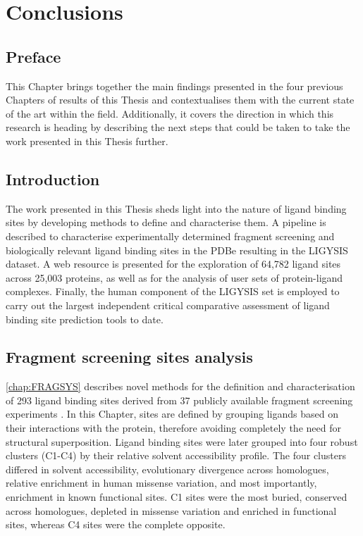 \chapter{Conclusions}

\section*{Preface}

This Chapter brings together the main findings presented in the four previous Chapters of results of this Thesis and contextualises them with the current state of the art within the field. Additionally, it covers the direction in which this research is heading by describing the next steps that could be taken to take the work presented in this Thesis further.

\section{Introduction}

The work presented in this Thesis sheds light into the nature of ligand binding sites by developing methods to define and characterise them. A pipeline is described to characterise experimentally determined fragment screening and biologically relevant ligand binding sites in the PDBe resulting in the LIGYSIS dataset. A web resource is presented for the exploration of 64,782 ligand sites across 25,003 proteins, as well as for the analysis of user sets of protein-ligand complexes. Finally, the human component of the LIGYSIS set is employed to carry out the largest independent critical comparative assessment of ligand binding site prediction tools to date.

\section{Fragment screening sites analysis}

\autoref{chap:FRAGSYS} describes novel methods for the definition and characterisation of 293 ligand binding sites derived from 37 publicly available fragment screening experiments \cite{UTGES_2024_FRAGSYS}. In this Chapter, sites are defined by grouping ligands based on their interactions with the protein, therefore avoiding completely the need for structural superposition. Ligand binding sites were later grouped into four robust clusters (C1-C4) by their relative solvent accessibility profile. The four clusters differed in solvent accessibility, evolutionary divergence across homologues, relative enrichment in human missense variation, and most importantly, enrichment in known functional sites. C1 sites were the most buried, conserved across homologues, depleted in missense variation and enriched in functional sites, whereas C4 sites were the complete opposite.

